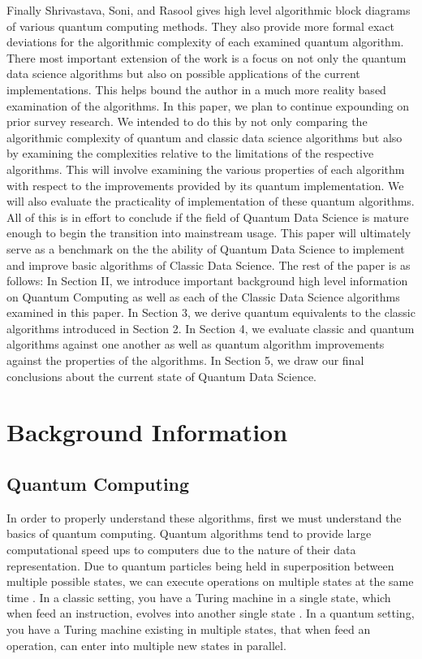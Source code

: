 \documentclass[conference]{IEEEtran}
\begin{document}
\newline
\indent Finally Shrivastava, Soni, and Rasool gives high level algorithmic block diagrams of various quantum computing methods. They also provide more formal exact deviations for the algorithmic complexity of each examined quantum algorithm. There most important extension of the work is a focus on not only the quantum data science algorithms but also on possible applications of the current implementations. This helps bound the author in a much more reality based examination of the algorithms.\cite{b8}    
\newline
\indent In this paper, we plan to continue expounding on prior survey research. We intended to do this by not only comparing the algorithmic complexity of quantum and classic data science algorithms but also by examining the complexities relative to the limitations of the respective algorithms. This will involve examining the various properties of each algorithm with respect to the improvements provided by its quantum implementation. We will also evaluate the practicality of implementation of these quantum algorithms. All of this is in effort to conclude if the field of Quantum Data Science is mature enough to begin the transition into mainstream usage. 
\newline
\indent This paper will ultimately serve as a benchmark on the the ability of Quantum Data Science to implement and improve basic algorithms of Classic Data Science. The rest of the paper is as follows: In Section II, we introduce important background high level information on Quantum Computing as well as each of the Classic Data Science algorithms examined in this paper. In Section 3, we derive quantum equivalents to the classic algorithms introduced in Section 2. In Section 4, we evaluate classic and quantum algorithms against one another as well as quantum algorithm improvements against the properties of the algorithms. In Section 5, we draw our final conclusions about the current state of Quantum Data Science.    
\section{Background Information}

\subsection{Quantum Computing}
In order to properly understand these algorithms, first we must understand the basics of quantum computing. Quantum algorithms tend to provide large computational speed ups to computers due to the nature of their data representation. Due to quantum particles being held in superposition between multiple possible states, we can execute operations on multiple states at the same time \cite{b5}. In a classic setting, you have a Turing machine in a single state, which when feed an instruction, evolves into another single state \cite{b9}. In a quantum setting, you have a Turing machine existing in multiple states, that when feed an operation, can enter into multiple new states in parallel.   
\end{document}
